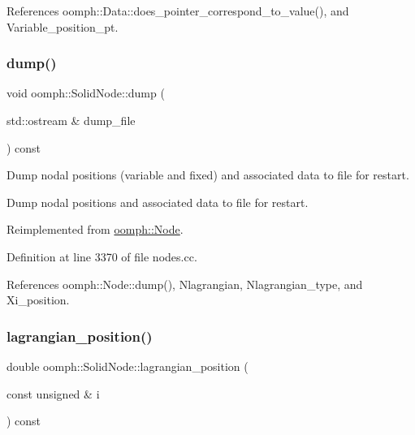 References oomph\+::\+Data\+::does\+\_\+pointer\+\_\+correspond\+\_\+to\+\_\+value(), and Variable\+\_\+position\+\_\+pt.

\mbox{\label{classoomph_1_1SolidNode_aad56eb7d55fcd10b3aaa34c5b4ab9f6a}} 
\subsubsection{\texorpdfstring{dump()}{dump()}}
{\footnotesize\ttfamily void oomph\+::\+Solid\+Node\+::dump (\begin{DoxyParamCaption}\item[{std\+::ostream \&}]{dump\+\_\+file }\end{DoxyParamCaption}) const\hspace{0.3cm}{\ttfamily [virtual]}}



Dump nodal positions (variable and fixed) and associated data to file for restart. 

Dump nodal positions and associated data to file for restart. 

Reimplemented from \hyperlink{classoomph_1_1Node_acd8bb142619d639d9bbfe813d0ba08df}{oomph\+::\+Node}.



Definition at line 3370 of file nodes.\+cc.



References oomph\+::\+Node\+::dump(), Nlagrangian, Nlagrangian\+\_\+type, and Xi\+\_\+position.

\mbox{\label{classoomph_1_1SolidNode_a790277999eb7d8ff0c3f2398d8aaedb0}} 
\subsubsection{\texorpdfstring{lagrangian\+\_\+position()}{lagrangian\_position()}}
{\footnotesize\ttfamily double oomph\+::\+Solid\+Node\+::lagrangian\+\_\+position (\begin{DoxyParamCaption}\item[{const unsigned \&}]{i }\end{DoxyParamCaption}) const}



